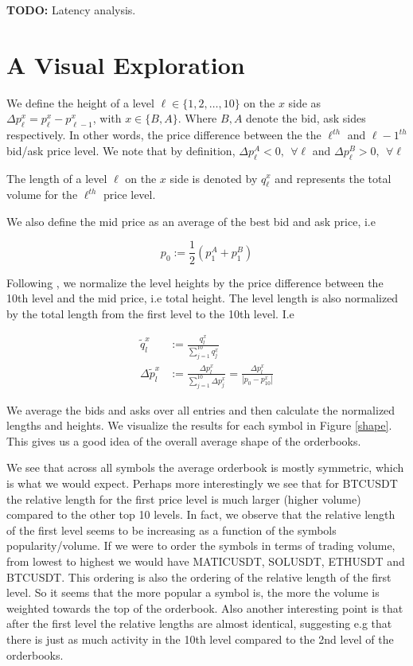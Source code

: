 \documentclass[a4paper, oneside, notitlepage]{book}
\begin{document}
\textbf{TODO:} Latency analysis.


\section{A Visual Exploration}

We define the height of a level $\ell \in \{ 1, 2, \dots, 10 \}$ on the $x$ side as $\Delta p_{\ell}^x = p_{\ell}^x - p_{\ell-1}^x$, with $x \in{\{ B,A \}}$. 
Where $B,A$ denote the bid, ask sides respectively. 
In other words, the price difference between the the $\ell^{th}$ and $\ell-1^{th}$ bid/ask price level.
We note that by definition, $\Delta p_{\ell}^A < 0, ~ ~ \forall \ell$ and $\Delta p_{\ell}^B > 0, ~ ~ \forall \ell$

The length of a level $\ell$ on the $x$ side is denoted by $q^x_{\ell}$ and represents the total volume
for the $\ell^{th}$ price level.

We also define the mid price as an average of the best bid and ask price, i.e

\begin{equation}
    p_0 := \frac{1}{2} (p^A_{1} + p^B_{1}) \label{mid}
\end{equation}

Following \cite{CAO2009}, we normalize the level heights by the price difference
between the 10th level and the mid price, i.e total height. 
The level length is also normalized by the total length from the first level to the 10th level.
I.e 

\begin{align}
    \tilde{q}_{l}^x &:= \frac{q_{l}^x}{\sum_{j=1}^{10} q_{j}^x}  \\
    \Delta\tilde{p}_{l}^x &:= \frac{\Delta p_{l}^x}{\sum_{j=1}^{10} \Delta p_{j}^x} = \frac{\Delta p_{l}^x}{|p_{0} - p_{10}^x|}
\end{align}

We average the bids and asks over all entries and then calculate the normalized lengths
and heights. We visualize the results for each symbol in Figure \ref{shape}.
This gives us a good idea of the overall average shape of the orderbooks.

We see that across all symbols the average orderbook is mostly symmetric,
which is what we would expect. Perhaps more interestingly we see that for BTCUSDT the relative
length for the first price level is much larger (higher volume) compared to the other top 10 levels.
In fact, we observe that the relative length of the first level seems to be increasing as a function
of the symbols popularity/volume. If we were to order the symbols in terms of trading volume, from 
lowest to highest we would have MATICUSDT, SOLUSDT, ETHUSDT and BTCUSDT. This ordering
is also the ordering of the relative length of the first level. So it seems that
the more popular a symbol is, the more the volume is weighted towards the top of
the orderbook. Also another interesting point is that after the first level
the relative lengths are almost identical, suggesting e.g that there is just as much
activity in the 10th level compared to the 2nd level of the orderbooks.
\end{document}
